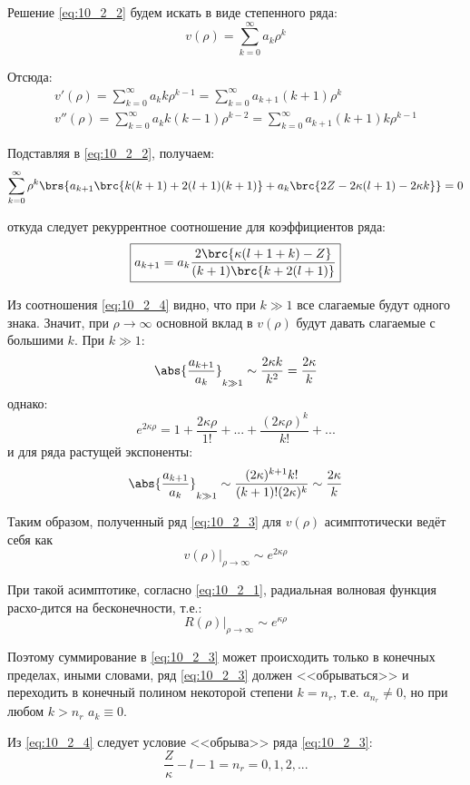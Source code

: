 Решение \eqref{eq:10_2_2} будем искать в виде степенного ряда:
\begin{equation}
\label{eq:10_2_3}
v(\rho) = \sum_{k=0}^{\infty} a_k \rho^k
\end{equation}

Отсюда:
$$
\begin{gathered}
v'(\rho) = \sum_{k=0}^{\infty} a_k k \rho^{k-1} = \sum_{k=0}^{\infty} a_{k+1} (k+1) \rho^k \\
v''(\rho) = \sum_{k=0}^{\infty} a_k k (k-1) \rho^{k-2} = \sum_{k=0}^{\infty} a_{k+1} (k+1) k \rho^{k-1}
\end{gathered}
$$

Подставляя в \eqref{eq:10_2_2}, получаем:
$$
\sum_{k=0}^{\infty} \rho^k \brs{a_{k+1} \brc{k(k+1) + 2(l+1)(k+1)} + a_k\brc{2Z - 2\kappa(l+1) - 2\kappa k} } = 0
$$

откуда следует рекуррентное соотношение для коэффициентов ряда:
\begin{equation}
\label{eq:10_2_4}
\boxed{
	a_{k+1} = a_k \frac{2\brc{\kappa(l+1+k)-Z}}{(k+1)\brc{k+2(l+1)}}
}
\end{equation}

Из соотношения \eqref{eq:10_2_4} видно, что при $k \gg 1$ все слагаемые будут одного знака. Значит, при $\rho \to \infty$ основной вклад в $v(\rho)$ будут давать слагаемые с большими $k$. При $k \gg 1$:
$$
{ \abs{\frac{a_{k+1}}{a_k}} }_{k \gg 1} \sim \frac{2\kappa k}{k^2} = \frac{2\kappa}{k}
$$
однако:
$$
e^{2\kappa \rho} = 1 + \frac{2\kappa \rho}{1!} + ... + \frac{(2\kappa \rho)^k}{k!} + ...
$$
и для ряда растущей экспоненты:
$$
{ \abs{\frac{a_{k+1}}{a_k}} }_{k \gg 1} \sim \frac{(2\kappa)^{k+1} k!}{(k+1)! (2\kappa)^k} \sim \frac{2\kappa}{k}
$$

Таким образом, полученный ряд \eqref{eq:10_2_3} для $v(\rho)$ асимптотически ведёт себя как
$$
\left. v(\rho) \right|_{\rho \to \infty} \sim e^{2\kappa \rho}
$$

При такой асимптотике, согласно \eqref{eq:10_2_1}, радиальная волновая функция расхо-дится на бесконечности, т.е.:
$$
\left. R(\rho) \right|_{\rho \to \infty} \sim e^{\kappa \rho}
$$

Поэтому суммирование в \eqref{eq:10_2_3} может происходить только в конечных пределах, иными словами, ряд \eqref{eq:10_2_3} должен <<обрываться>> и переходить в конечный полином некоторой степени $k=n_r$, т.е. $a_{n_r} \neq 0$, но при любом $k > n_r$ $a_k \equiv 0$.

Из \eqref{eq:10_2_4} следует условие <<обрыва>> ряда \eqref{eq:10_2_3}:
\begin{equation}
\label{eq:10_2_5}
\boxed{
	\frac{Z}{\kappa} - l - 1 = n_r = 0, 1, 2, ...
}
\end{equation}

